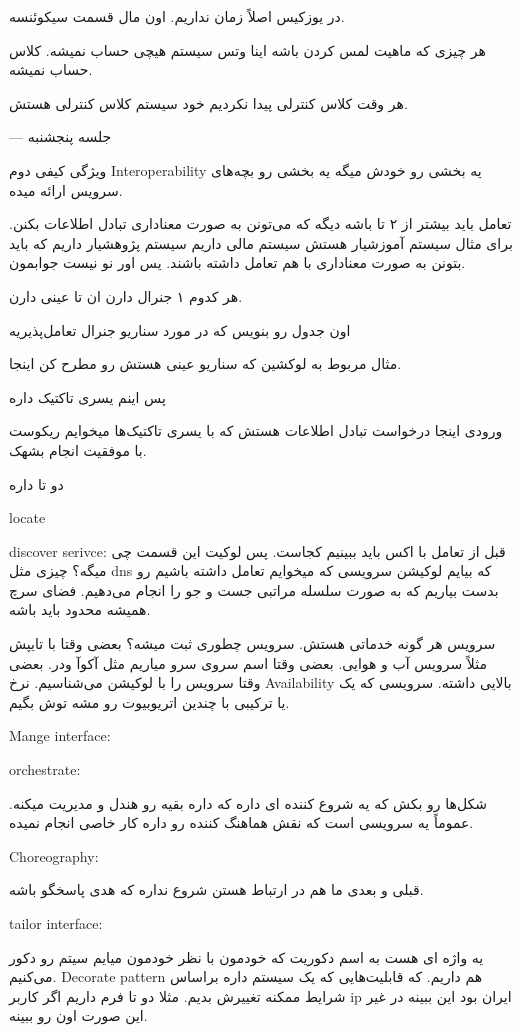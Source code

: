 در یوزکیس اصلاً زمان نداریم. اون مال قسمت سیکوئنسه.

هر چیزی که ماهیت لمس کردن باشه اینا وتس سیستم هیچی حساب نمیشه. کلاس حساب نمیشه.

هر وقت کلاس کنترلی پیدا نکردیم خود سیستم کلاس کنترلی هستش.

--- جلسه پنجشنبه

ویژگی کیفی دوم Interoperability یه بخشی رو خودش میگه یه بخشی رو بچه‌های سرویس
ارائه میده.

تعامل باید بیشتر از ۲ تا باشه دیگه که می‌تونن به صورت معناداری تبادل اطلاعات
بکنن. برای مثال سیستم آموزشیار هستش سیستم مالی داریم سیستم پژوهشیار داریم که
باید بتونن به صورت معناداری با هم تعامل داشته باشند. یس اور نو نیست جوابمون.

هر کدوم ۱ جنرال دارن
ان تا عینی دارن.

اون جدول رو بنویس که در مورد سناریو جنرال تعامل‌پذیریه

مثال مربوط به لوکشین که سناریو عینی هستش رو مطرح کن اینجا.

پس اینم یسری تاکتیک داره

ورودی اینجا درخواست تبادل اطلاعات هستش که با یسری تاکتیک‌ها میخوایم ریکوست با
موفقیت انجام بشهک.

دو تا داره

locate

discover serivce: قبل از تعامل با اکس باید ببینیم کجاست. پس لوکیت این قسمت چی
میگه؟ چیزی مثل dns که بیایم لوکیشن سرویسی که میخوایم تعامل داشته باشیم رو بدست
بیاریم که به صورت سلسله مراتبی جست و جو را انجام می‌دهیم. فضای سرچ همیشه محدود
باید باشه.

سرویس هر گونه خدماتی هستش. سرویس چطوری ثبت میشه؟ بعضی وقتا با تایپش مثلاً سرویس
آب و هوایی. بعضی وقتا اسم سروی سرو میاریم مثل آکوآ ودر. بعضی وقتا سرویس را با
لوکیشن می‌شناسیم. نرخ Availability بالایی داشته. سرویسی که  یک یا ترکیبی با
چندین اتریوبیوت رو مشه توش بگیم. 

Mange interface:

orchestrate:

شکل‌ها رو بکش که یه شروع کننده ای داره که داره بقیه رو هندل و مدیریت میکنه.
عموماً یه سرویسی است که نقش هماهنگ کننده رو داره کار خاصی انجام نمیده.

Choreography:

قبلی و بعدی ما هم در ارتباط هستن شروع نداره که هدی پاسخگو باشه.


tailor interface:

یه واژه ای هست به اسم دکوریت که خودمون با نظر خودمون میایم سیتم رو دکور می‌کنیم.
Decorate pattern هم داریم. که قابلیت‌هایی که یک سیستم داره براساس شرایط ممکنه
تغییرش بدیم. مثلا دو تا فرم داریم اگر کاربر ip ایران بود این ببینه در غیر این
صورت اون رو ببینه.

